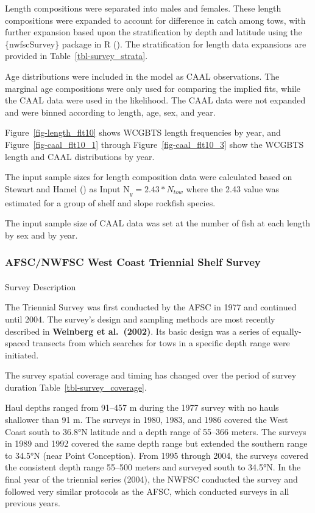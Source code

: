 \documentclass[
]{scrartcl}
\makeatletter
\let\oldparagraph\paragraph
\renewcommand{\paragraph}{
    \@ifstar
      \xxxParagraphStar
      \xxxParagraphNoStar
  }
\newcommand{\xxxParagraphStar}[1]{\oldparagraph*{#1}\mbox{}}
\newcommand{\xxxParagraphNoStar}[1]{\oldparagraph{#1}\mbox{}}
\makeatother
\begin{document}
Length compositions were separated into males and females. These length
compositions were expanded to account for difference in catch among
tows, with further expansion based upon the stratification by depth and
latitude using the \{nwfscSurvey\} package in R
(). The stratification for length data expansions are provided in
Table~\ref{tbl-survey_strata}.

Age distributions were included in the model as CAAL observations. The
marginal age compositions were only used for comparing the implied fits,
while the CAAL data were used in the likelihood. The CAAL data were not
expanded and were binned according to length, age, sex, and year.

Figure~\ref{fig-length_flt10} shows WCGBTS length frequencies by year,
and Figure~\ref{fig-caal_flt10_1} through Figure~\ref{fig-caal_flt10_3}
show the WCGBTS length and CAAL distributions by year.

The input sample sizes for length composition data were calculated based
on Stewart and Hamel ()
as \(\text{Input N}_{y} = 2.43*N_{tow}\) where the 2.43 value was
estimated for a group of shelf and slope rockfish species.

The input sample size of CAAL data was set at the number of fish at each
length by sex and by year.

\subsubsection{AFSC/NWFSC West Coast Triennial Shelf
Survey}\label{afscnwfsc-west-coast-triennial-shelf-survey}

\paragraph{Survey Description}\label{survey-description-1}

The Triennial Survey was first conducted by the AFSC in 1977 and
continued until 2004. The survey's design and sampling methods are most
recently described in \textbf{Weinberg et al.~(2002)}. Its basic design
was a series of equally-spaced transects from which searches for tows in
a specific depth range were initiated.

The survey spatial coverage and timing has changed over the period of
survey duration Table~\ref{tbl-survey_coverage}.

Haul depths ranged from 91--457 m during the 1977 survey with no hauls
shallower than 91 m. The surveys in 1980, 1983, and 1986 covered the
West Coast south to 36.8°N latitude and a depth range of 55--366 meters.
The surveys in 1989 and 1992 covered the same depth range but extended
the southern range to 34.5°N (near Point Conception). From 1995 through
2004, the surveys covered the consistent depth range 55--500 meters and
surveyed south to 34.5°N. In the final year of the triennial series
(2004), the NWFSC conducted the survey and followed very similar
protocols as the AFSC, which conducted surveys in all previous years.
\end{document}
